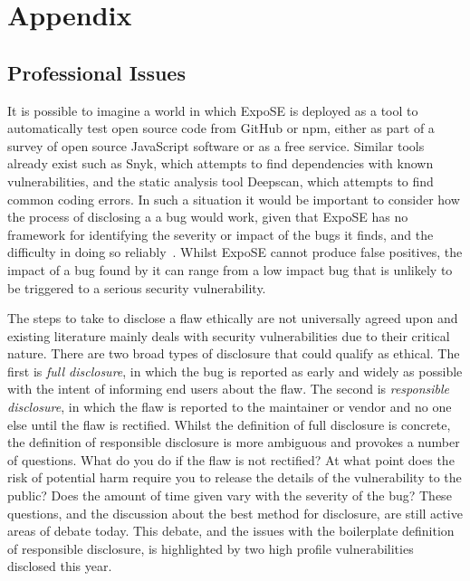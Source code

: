 \documentclass[]{final_report}
\begin{document}
\newpage

\chapter{Appendix}

\section{Professional Issues}
It is possible to imagine a world in which ExpoSE is deployed as a tool to automatically test open source code from GitHub or npm, either as part of a survey of open source JavaScript software or as a free service. Similar tools already exist such as Snyk, which attempts to find dependencies with known vulnerabilities, and the static analysis tool Deepscan, which attempts to find common coding errors. In such a situation it would be important to consider how the process of disclosing a a bug would work, given that ExpoSE has no framework for identifying the severity or impact of the bugs it finds, and the difficulty in doing so reliably~\cite{lamkanfi2010predicting}. Whilst ExpoSE cannot produce false positives, the impact of a bug found by it can range from a low impact bug that is unlikely to be triggered to a serious security vulnerability. 

The steps to take to disclose a flaw ethically are not universally agreed upon and existing literature mainly deals with security vulnerabilities due to their critical nature. There are two broad types of disclosure that could qualify as ethical. The first is \textit{full disclosure}, in which the bug is reported as early and widely as possible with the intent of informing end users about the flaw. The second is \textit{responsible disclosure}, in which the flaw is reported to the maintainer or vendor and no one else until the flaw is rectified. Whilst the definition of full disclosure is concrete, the definition of responsible disclosure is more ambiguous and provokes a number of questions. What do you do if the flaw is not rectified? At what point does the risk of potential harm require you to release the details of the vulnerability to the public? Does the amount of time given vary with the severity of the bug? These questions, and the discussion about the best method for disclosure, are still active areas of debate today. This debate, and the issues with the boilerplate definition of responsible disclosure, is highlighted by two high profile vulnerabilities disclosed this year. 
\end{document}
